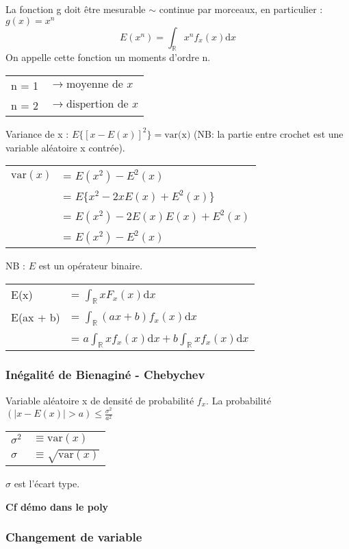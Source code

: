 \documentclass[]{article}
\begin{document}
La fonction g doit être mesurable $\sim$ continue par morceaux, en
particulier : $g(x) = x^n$
\[E(x^n) = \int_{\mathbb{R}} x^n f_x(x) \mathrm{d}x\] On appelle cette
fonction un moments d'ordre n.

\begin{tabular}{l l}
n = 1 & $\rightarrow \text{moyenne de } x$ \\
n = 2 & $\rightarrow \text{dispertion de } x$ \\
\end{tabular}

Variance de x : $E\{[x-E(x)]^2\} = \text{var(x)}$ (NB: la partie entre
crochet est une variable aléatoire x contrée).

\begin{tabular}{r l}
$\text{var}(x)$ &= $E(x^2) -E^2(x)$ \\
&= $E\{x^2 - 2xE(x)+E^2(x)\}$ \\
&= $E (x^2) - 2E(x)E(x) + E^2(x)$ \\
&= $E (x^2) - E^2(x)$ \\
\end{tabular}

NB : $E$ est un opérateur binaire.

\begin{tabular}{l l}
E(x) &= $\int_\mathbb{R} x F_x(x) \mathrm{d}x$ \\
E(ax + b) &= $\int_\mathbb{R} (ax+b)f_x(x)\mathrm{d}x$ \\
&= $a\int_\mathbb{R} x f_x(x) \mathrm{d}x +b\int_\mathbb{R} x f_x(x) \mathrm{d}x$ \\
\end{tabular}

\subsubsection{Inégalité de Bienaginé - Chebychev}

Variable aléatoire x de densité de probabilité $f_x$. La probabilité
$(\lvert x - E(x)\rvert > a) \leq \frac{\sigma^2}{a^2}$

\begin{tabular}{l l}
$\sigma^2$ & $\equiv \text{var}(x)$ \\
$\sigma$ & $\equiv \sqrt{\text{var}(x)}$ \\
\end{tabular}

$\sigma$ est l'écart type.

\textbf{Cf démo dans le poly}

\subsubsection{Changement de variable}
\end{document}
